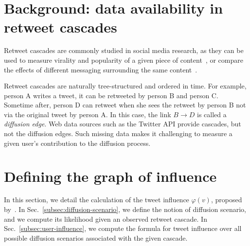 %

\section{Background: data availability in retweet cascades}
\label{sec:background}

Retweet cascades are commonly studied in social media research, as they
can be used to measure virality and popularity of a given piece of content~\cite{Mishra2016,Zhao2015},
or compare the effects of different messaging surrounding the same content~\cite{tan2014effect}.

Retweet cascades are naturally tree-structured and ordered in time.
For example, person A writes a tweet, it can be retweeted by person B and person C.
Sometime after, person D can retweet when she sees the retweet by person B
not via the original tweet by person A. In this case, the link $B \rightarrow D$ is called
a {\em diffusion edge}.
Web data sources such as the Twitter
API provide cascades, but not the diffusion edges. Such
missing data makes it challenging to measure a given user’s
contribution to the diffusion process.

\section{Defining the graph of influence}
\label{si-sec:infl-derivation}

In this section, we detail the calculation of the tweet influence $\varphi(v)$, proposed by~\citet{Rizoiu2018a}.
In Sec.~\ref{subsec:diffusion-scenario}, we define the notion of diffusion scenario, and we compute its likelihood given an observed retweet cascade.
In Sec.~\ref{subsec:user-influence}, we compute the formula for tweet influence over all possible diffusion scenarios associated with the given cascade.


